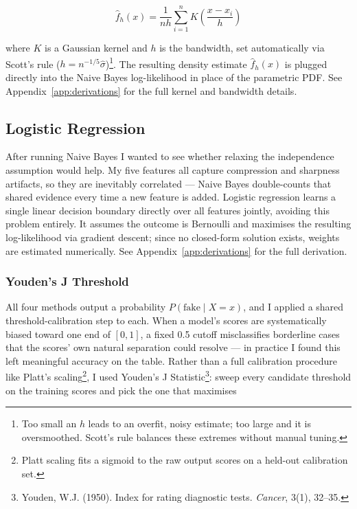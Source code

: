 \documentclass{article}
\begin{document}
\begin{equation}
\hat{f}_h(x) = \frac{1}{nh} \sum_{i=1}^n K\!\left(\frac{x - x_i}{h}\right)
\end{equation}

where $K$ is a Gaussian kernel and $h$ is the bandwidth, set automatically via Scott's rule ($h = n^{-1/5}\hat{\sigma}$)\footnote{Too small an $h$ leads to an overfit, noisy estimate; too large and it is oversmoothed. Scott's rule balances these extremes without manual tuning.}. The resulting density estimate $\hat{f}_h(x)$ is plugged directly into the Naive Bayes log-likelihood in place of the parametric PDF. See Appendix~\ref{app:derivations} for the full kernel and bandwidth details.

\subsection*{Logistic Regression}
After running Naive Bayes I wanted to see whether relaxing the independence assumption would help. My five features all capture compression and sharpness artifacts, so they are inevitably correlated --- Naive Bayes double-counts that shared evidence every time a new feature is added. Logistic regression learns a single linear decision boundary directly over all features jointly, avoiding this problem entirely. It assumes the outcome is Bernoulli and maximises the resulting log-likelihood via gradient descent; since no closed-form solution exists, weights are estimated numerically. See Appendix~\ref{app:derivations} for the full derivation.

\subsubsection*{Youden's J Threshold}
All four methods output a probability $P(\text{fake} \mid X = x)$, and I applied a shared threshold-calibration step to each. When a model's scores are systematically biased toward one end of $[0, 1]$, a fixed 0.5 cutoff misclassifies borderline cases that the scores' own natural separation could resolve --- in practice I found this left meaningful accuracy on the table. Rather than a full calibration procedure like Platt's scaling\footnote{Platt scaling fits a sigmoid to the raw output scores on a held-out calibration set.}, I used Youden's J Statistic\footnote{Youden, W.J. (1950). Index for rating diagnostic tests. \textit{Cancer}, 3(1), 32--35.}: sweep every candidate threshold on the training scores and pick the one that maximises
\end{document}
